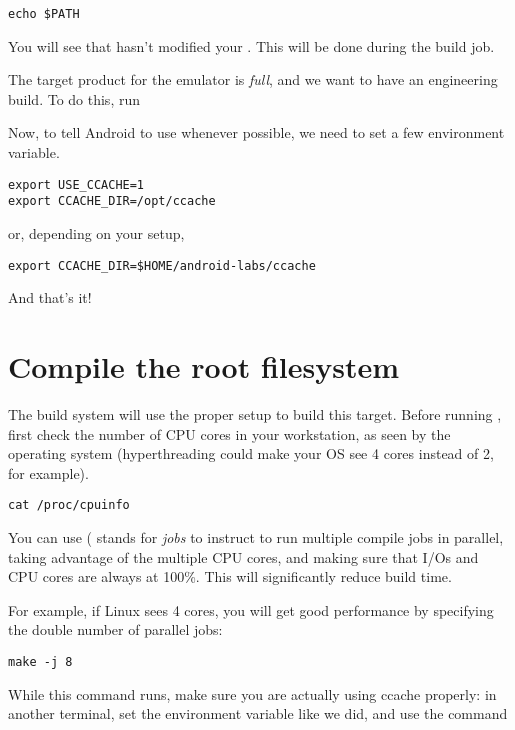 \begin{verbatim}
echo $PATH
\end{verbatim}

You will see that  hasn't modified your
.  This will be done during the build job.

The target product for the emulator is {\it full}, and we want to
have an engineering build. To do this, run 

Now, to tell Android to use  whenever possible, we need
to set a few environment variable.

\begin{verbatim}
export USE_CCACHE=1
export CCACHE_DIR=/opt/ccache
\end{verbatim}
or, depending on your setup,
\begin{verbatim}
export CCACHE_DIR=$HOME/android-labs/ccache
\end{verbatim}

And that's it!

\section{Compile the root filesystem}

The build system will use the proper setup to build this
target. Before running , first check the number of CPU
cores in your workstation, as seen by the operating system
(hyperthreading could make your OS see 4 cores instead of 2, for
example).

\begin{verbatim}
cat /proc/cpuinfo
\end{verbatim}

You can use  ( stands for {\it jobs} to instruct
 to run multiple compile jobs in parallel, taking advantage
of the multiple CPU cores, and making sure that I/Os and CPU cores are
always at 100\%. This will significantly reduce build time.

For example, if Linux sees 4 cores, you will get good performance by
specifying the double number of parallel jobs:

\begin{verbatim}
make -j 8
\end{verbatim}

While this command runs, make sure you are actually using ccache
properly: in another terminal, set the  environment
variable like we did, and use the command


